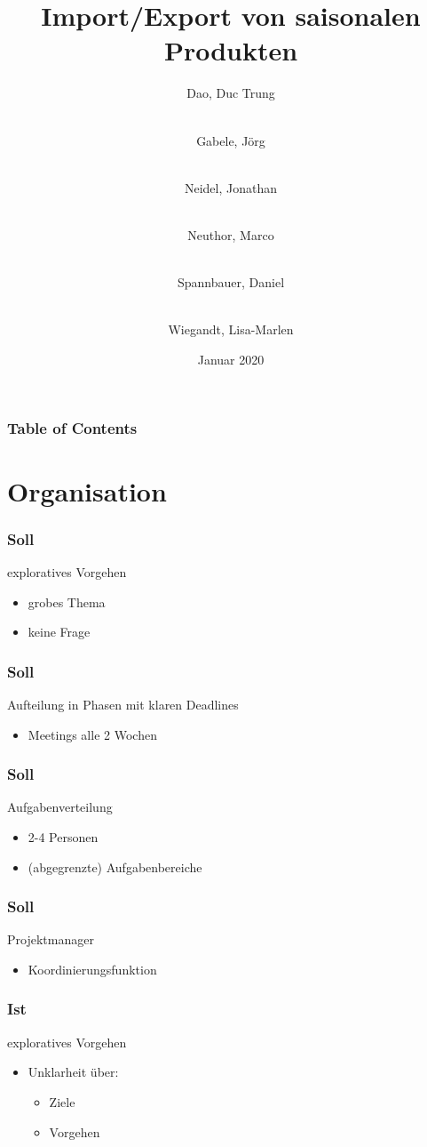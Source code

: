 \documentclass{beamer}
\title{Import/Export von saisonalen Produkten}
\author[Dao, Gabele, Neidel, Neuthor, Spannbauer, Wiegandt]{
  Dao, Duc Trung \and\\
  Gabele, Jörg \and\\
  Neidel, Jonathan \and\\
  Neuthor, Marco \and\\
  Spannbauer, Daniel \and\\
  Wiegandt, Lisa-Marlen
}
\date{Januar 2020}
\institute{HTW Berlin, Angewandte Informatik}
\begin{document}
\frame{\titlepage}

\begin{frame}
\frametitle{Table of Contents}
\tableofcontents
\end{frame}


\section{Organisation}
\begin{frame}
\frametitle{Soll}
exploratives Vorgehen

  \begin{itemize}
    \item grobes Thema
    \item keine Frage
  \end{itemize}
\end{frame}

\begin{frame}
\frametitle{Soll}
Aufteilung in Phasen mit klaren Deadlines

  \begin{itemize}
    \item Meetings alle 2 Wochen
  \end{itemize}

\end{frame}

\begin{frame}
\frametitle{Soll}
Aufgabenverteilung
  \begin{itemize}
    \item 2-4 Personen
    \item (abgegrenzte) Aufgabenbereiche
  \end{itemize}
\end{frame}

\begin{frame}
\frametitle{Soll}
Projektmanager
  \begin{itemize}
    \item Koordinierungsfunktion
  \end{itemize}

\end{frame}

\begin{frame}
\frametitle{Ist}
exploratives Vorgehen

  \begin{itemize}
    \item Unklarheit über:
      \begin{itemize}
        \item Ziele
        \item Vorgehen
      \end{itemize}
  \end{itemize}

\end{frame}
\end{document}
